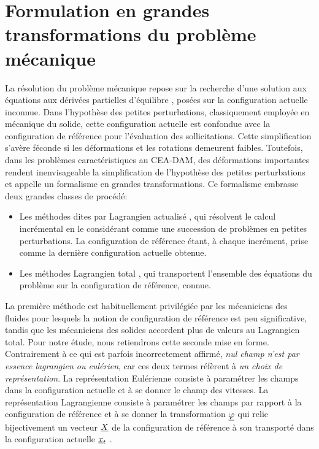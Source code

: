 \documentclass[10pt]{book}
\begin{document}
\section{Formulation en grandes transformations du problème mécanique}\label{Section:Formulation en grandes transformations du problème mécanique}
La résolution du problème mécanique repose sur la recherche d'une solution aux équations aux dérivées partielles d'équilibre , posées sur la configuration actuelle inconnue. Dans l'hypothèse des petites perturbations, classiquement employée en mécanique du solide, cette configuration actuelle est confondue avec la configuration de référence pour l'évaluation des sollicitations. Cette simplification s'avère féconde si les déformations et les rotations demeurent faibles. Toutefois, dans les problèmes caractéristiques au CEA-DAM, des déformations importantes rendent inenvisageable la simplification de l'hypothèse des petites perturbations et appelle un formalisme en grandes transformations. Ce formalisme embrasse deux grandes classes de procédé: 
\begin{itemize}
\item Les méthodes dites par \og Lagrangien actualisé \fg{}, qui résolvent le calcul incrémental en le considérant comme une succession de problèmes en petites perturbations. La configuration de référence étant, à chaque incrément, prise comme la dernière configuration actuelle obtenue.
\item Les méthodes \og Lagrangien total \fg{}, qui transportent l'ensemble des équations du problème sur la configuration de référence, connue.
\end{itemize}
La première méthode est habituellement privilégiée par les mécaniciens des fluides pour lesquels la notion de configuration de référence est peu significative, tandis que les mécaniciens des solides accordent plus de valeurs au Lagrangien total. Pour notre étude, nous retiendrons cette seconde mise en forme.\\

Contrairement à ce qui est parfois incorrectement affirmé, \emph{nul champ n'est par essence lagrangien ou eulérien}, car ces deux termes réfèrent à \emph{un choix de représentation}. La représentation Eulérienne consiste à paramétrer les champs dans la configuration actuelle et à se donner le champ des vitesses. La représentation Lagrangienne consiste à paramétrer les champs par rapport à la configuration de référence et à se donner la transformation $\underline{\varphi}$ qui relie bijectivement un vecteur $\underline{X}$ de la configuration de référence à son \og transporté dans la configuration actuelle \fg{} $\underline{x}_{t}$ .\\
\end{document}
